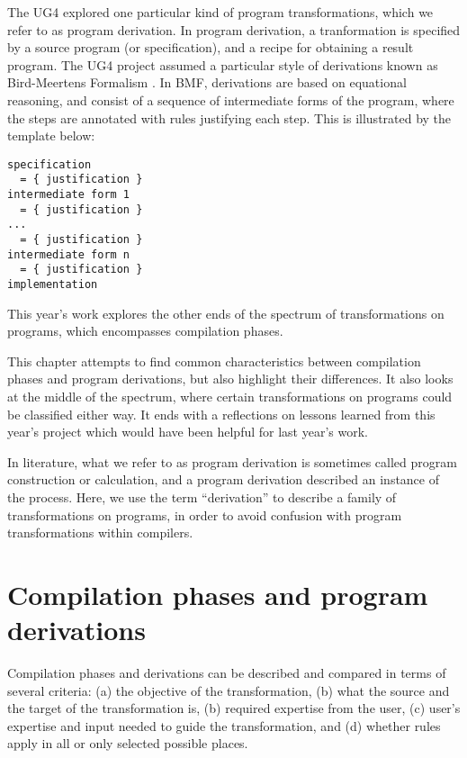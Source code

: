 \documentclass[bsc,frontabs,oneside,singlespacing,parskip,deptreport]{infthesis}
\theoremstyle{definition}
\theoremstyle{lemma}
\begin{document}
The UG4 explored one particular kind of program transformations, which
we refer to as program derivation. In program derivation, a
tranformation is specified by a source program (or specification), and
a recipe for obtaining a result program. The UG4 project assumed a
particular style of derivations known as Bird-Meertens Formalism
\cite{gibbons1994introduction}. In BMF, derivations are based on
equational reasoning, and consist of a sequence of intermediate forms
of the program, where the steps are annotated with rules justifying
each step. This is illustrated by the template below:

\begin{verbatim}
specification
  = { justification }
intermediate form 1
  = { justification }
...
  = { justification }
intermediate form n
  = { justification }
implementation
\end{verbatim}

This year's work explores the other ends of the spectrum of
transformations on programs, which encompasses compilation
phases.

This chapter attempts to find common characteristics between
compilation phases and program derivations, but also highlight their
differences. It also looks at the middle of the spectrum, where
certain transformations on programs could be classified either way. It
ends with a reflections on lessons learned from this year's project
which would have been helpful for last year's work.

In literature, what we refer to as program derivation is sometimes
called program construction or calculation, and a program derivation
described an instance of the process. Here, we use the term
``derivation'' to describe a family of transformations on programs, in
order to avoid confusion with program transformations within compilers.

\section{Compilation phases and program derivations}
\label{sec:comp-phas-progr}

Compilation phases and derivations can be described and compared in
terms of several criteria: (a) the objective of the transformation,
(b) what the source and the target of the transformation is, (b)
required expertise from the user, (c) user's expertise and input
needed to guide the transformation, and (d) whether rules apply in all or
only selected possible places.
\end{document}
